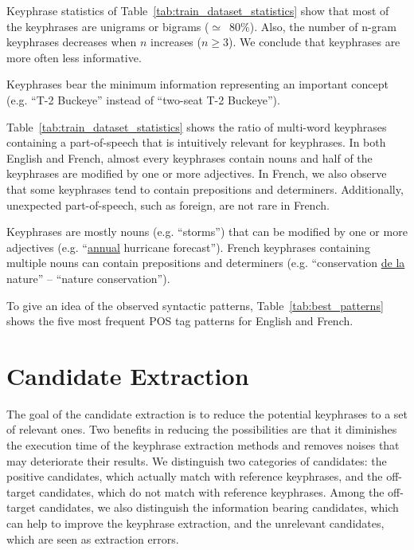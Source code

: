     Keyphrase statistics of Table~\ref{tab:train_dataset_statistics} show that
    most of the keyphrases are unigrams or bigrams ($\simeq$~$80\%$). Also, the
    number of n-gram keyphrases decreases when $n$ increases ($n\geq3$). We
    conclude that keyphrases are more often less informative.
    
    \begin{property}\label{prop:informativity}
      Keyphrases bear the minimum information representing an important concept
      (e.g. ``T-2 Buckeye'' instead of ``two-seat T-2 Buckeye'').
    \end{property}

    Table~\ref{tab:train_dataset_statistics} shows the ratio of multi-word
    keyphrases containing a part-of-speech that is intuitively relevant for
    keyphrases. In both English and French, almost every keyphrases contain
    nouns and half of the keyphrases are modified by one or more adjectives. In
    French, we also observe that some keyphrases tend to contain prepositions
    and determiners. Additionally, unexpected part-of-speech, such as foreign,
    are not rare in French.

    \begin{property}\label{prop:noun_phrases}
      Keyphrases are mostly nouns (e.g. ``storms'') that can be modified by one
      or more adjectives (e.g. ``\underline{annual} hurricane forecast'').
      French keyphrases containing multiple nouns can contain prepositions and
      determiners (e.g. ``conservation \underline{de la} nature'' -- ``nature
      conservation'').
    \end{property}

    To give an idea of the observed syntactic patterns,
    Table~\ref{tab:best_patterns} shows the five most frequent POS tag patterns
    for English and French.

\section{Candidate Extraction}
\label{sec:candidate_extraction}
  The goal of the candidate extraction is to reduce the potential keyphrases to
  a set of relevant ones. Two benefits in reducing the possibilities are that it
  diminishes the execution time of the keyphrase extraction methods and removes
  noises that may deteriorate their results. We distinguish two categories of
  candidates: the positive candidates, which actually match with reference
  keyphrases, and the off-target candidates, which do not match with reference
  keyphrases. Among the off-target candidates, we also distinguish the
  information bearing candidates, which can help to improve the keyphrase
  extraction, and the unrelevant candidates, which are seen as extraction
  errors.

